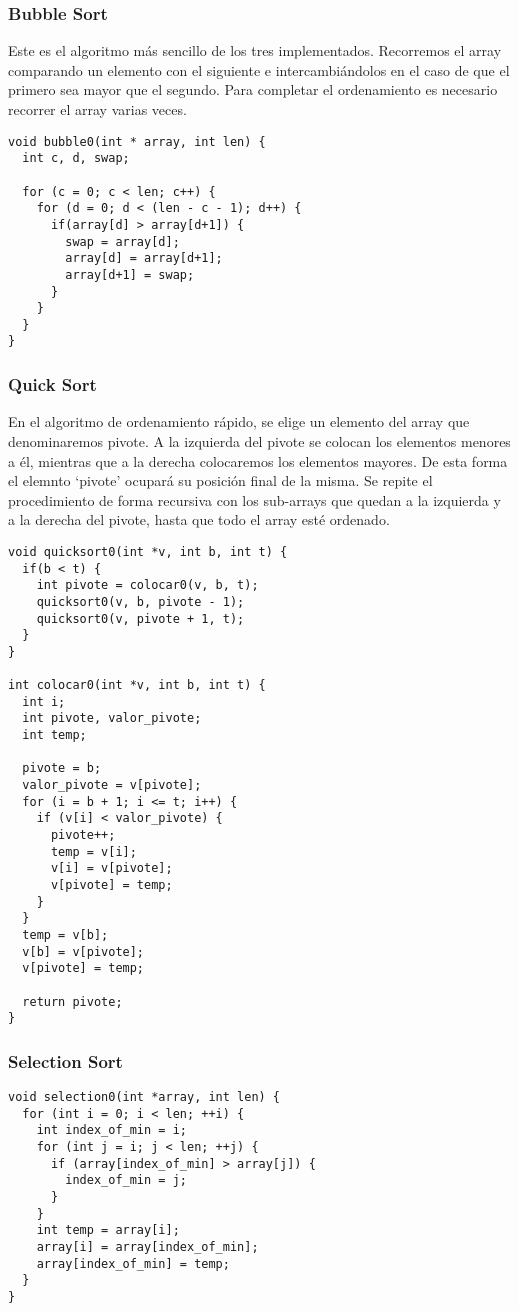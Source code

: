 \subsubsection{Bubble Sort}
Este es el algoritmo más sencillo de los tres implementados. Recorremos el array comparando un elemento con el siguiente e intercambiándolos en el caso de que el primero sea mayor que el segundo. Para completar el ordenamiento es necesario recorrer el array varias veces.
\begin{lstlisting}[caption=Implementación de Bubble Sort]
void bubble0(int * array, int len) {
  int c, d, swap;

  for (c = 0; c < len; c++) {
    for (d = 0; d < (len - c - 1); d++) {
      if(array[d] > array[d+1]) {
        swap = array[d];
        array[d] = array[d+1];
        array[d+1] = swap;
      }
    }
  }
}  
\end{lstlisting}\label{Implementación de Bubble Sort en nuestro programa}

\subsubsection{Quick Sort}
En el algoritmo de ordenamiento rápido, se elige un elemento del array que denominaremos pivote. A la izquierda del pivote se colocan los elementos menores a él, mientras que a la derecha colocaremos los elementos mayores. De esta forma el elemnto `pivote' ocupará su posición final de la misma. Se repite el procedimiento de forma recursiva con los sub-arrays que quedan a la izquierda y a la derecha del pivote, hasta que todo el array esté ordenado.
\begin{lstlisting}[caption=Implementación de Quick Sort]
void quicksort0(int *v, int b, int t) {
  if(b < t) {
    int pivote = colocar0(v, b, t);
    quicksort0(v, b, pivote - 1);
    quicksort0(v, pivote + 1, t);
  }
}

int colocar0(int *v, int b, int t) {
  int i;
  int pivote, valor_pivote;
  int temp;

  pivote = b;
  valor_pivote = v[pivote];
  for (i = b + 1; i <= t; i++) {
    if (v[i] < valor_pivote) {
      pivote++;
      temp = v[i];
      v[i] = v[pivote];
      v[pivote] = temp;
    }
  }
  temp = v[b];
  v[b] = v[pivote];
  v[pivote] = temp;

  return pivote;
}
\end{lstlisting}

\subsubsection{Selection Sort}

\begin{lstlisting}[caption=Implementación de Selection Sort]
void selection0(int *array, int len) {
  for (int i = 0; i < len; ++i) {
    int index_of_min = i;
    for (int j = i; j < len; ++j) {
      if (array[index_of_min] > array[j]) {
        index_of_min = j;
      }
    }
    int temp = array[i];
    array[i] = array[index_of_min];
    array[index_of_min] = temp;
  }
}
\end{lstlisting}